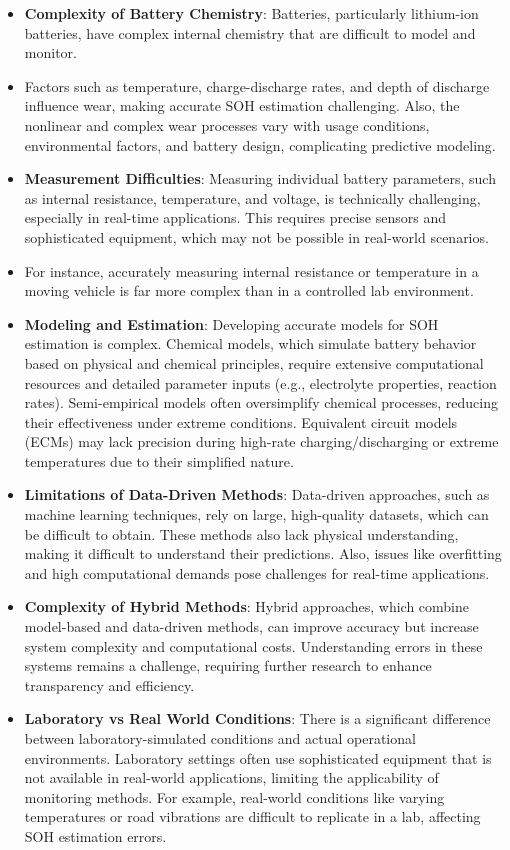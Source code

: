 \begin{itemize}
    \item \textbf{Complexity of Battery Chemistry}: Batteries, particularly lithium-ion batteries, have complex internal chemistry that are difficult to model and monitor.
    \item Factors such as temperature, charge-discharge rates, and depth of discharge influence wear, making accurate SOH estimation challenging. Also, the nonlinear and complex wear processes vary with usage conditions, environmental factors, and battery design, complicating predictive modeling.
    \item \textbf{Measurement Difficulties}: Measuring individual battery parameters, such as internal resistance, temperature, and voltage, is technically challenging, especially in real-time applications.  This requires precise sensors and sophisticated equipment, which may not be possible in real-world scenarios.
    \item For instance, accurately measuring internal resistance or temperature in a moving vehicle is far more complex than in a controlled lab environment.
    \item \textbf{Modeling and Estimation}: Developing accurate models for SOH estimation is complex. Chemical models, which simulate battery behavior based on physical and chemical principles, require extensive computational resources and detailed parameter inputs (e.g., electrolyte properties, reaction rates). Semi-empirical models often oversimplify chemical processes, reducing their effectiveness under extreme conditions. Equivalent circuit models (ECMs) may lack precision during high-rate charging/discharging or extreme temperatures due to their simplified nature.
    \item \textbf{Limitations of Data-Driven Methods}: Data-driven approaches, such as machine learning techniques, rely on large, high-quality datasets, which can be difficult to obtain. These methods also lack physical understanding, making it difficult to understand their predictions. Also, issues like overfitting and high computational demands pose challenges for real-time applications.
    \item \textbf{Complexity of Hybrid Methods}: Hybrid approaches, which combine model-based and data-driven methods, can improve accuracy but increase system complexity and computational costs. Understanding errors in these systems remains a challenge, requiring further research to enhance transparency and efficiency.
    \item \textbf{Laboratory vs Real World Conditions}: There is a significant difference between laboratory-simulated conditions and actual operational environments. Laboratory settings often use sophisticated equipment that is not available in real-world applications, limiting the applicability of monitoring methods. For example, real-world conditions like varying temperatures or road vibrations are difficult to replicate in a lab, affecting SOH estimation errors.

\end{itemize}
